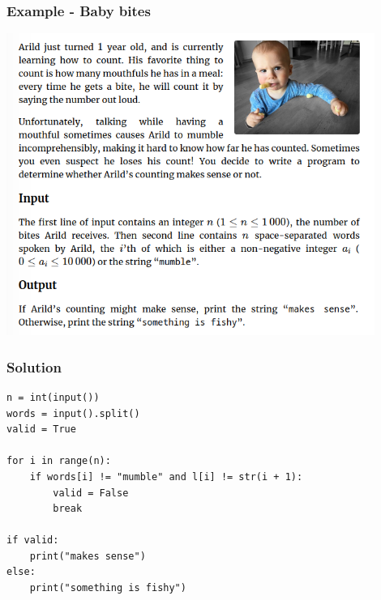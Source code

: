 \documentclass{beamer}
\begin{document}
\begin{frame}[plain]
    \frametitle{Example - Baby bites}
    \begin{center}
    		\includegraphics[width=0.9\textwidth]{babybites}
    	\end{center}
\end{frame}

\begin{frame}
    \frametitle{Solution}
    \begin{verbatim}
n = int(input())
words = input().split()
valid = True

for i in range(n):
    if words[i] != "mumble" and l[i] != str(i + 1):
        valid = False
        break

if valid:
    print("makes sense")
else:
    print("something is fishy")
    \end{verbatim}
\end{frame}
\end{document}
